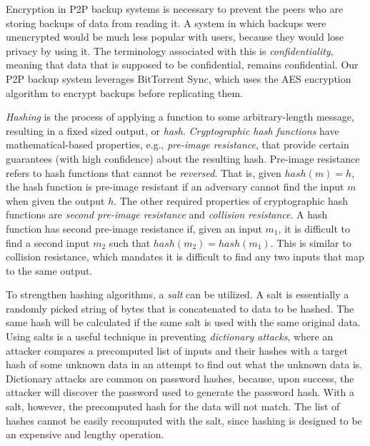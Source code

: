 \documentclass[12pt]{report}
\begin{document}
Encryption in P2P backup systems is necessary to prevent the peers who are storing backups of data from reading it. A system in which backups were unencrypted would be much less popular with users, because they would lose privacy by using it. The terminology associated with this is \textit{confidentiality}, meaning that data that is supposed to be confidential, remains confidential. Our P2P backup system leverages BitTorrent Sync, which uses the AES encryption algorithm to encrypt backups before replicating them.

\textit{Hashing} is the process of applying a function to some arbitrary-length message, resulting in a fixed sized output, or \textit{hash}. \textit{Cryptographic hash functions} have mathematical-based properties, e.g., \textit{pre-image resistance}, that provide certain guarantees (with high confidence) about the resulting hash. Pre-image resistance refers to hash functions that cannot be \textit{reversed}. That is, given $hash(m) = h$, the hash function is pre-image resistant if an adversary cannot find the input $m$ when given the output $h$. The other required properties of cryptographic hash functions are \textit{second pre-image resistance} and \textit{collision resistance}. A hash function has second pre-image resistance if, given an input $m_1$, it is difficult to find a second input $m_2$ such that $hash(m_2) = hash(m_1)$. This is similar to collision resistance, which mandates it is difficult to find any two inputs that map to the same output.

To strengthen hashing algorithms, a \textit{salt} can be utilized. A salt is essentially a randomly picked string of bytes that is concatenated to data to be hashed. The same hash will be calculated if the same salt is used with the same original data. Using salts is a useful technique in preventing \textit{dictionary attacks}, where an attacker compares a precomputed list of inputs and their hashes with a target hash of some unknown data in an attempt to find out what the unknown data is. Dictionary attacks are common on password hashes, because, upon success, the attacker will discover the password used to generate the password hash. With a salt, however, the precomputed hash for the data will not match. The list of hashes cannot be easily recomputed with the salt, since hashing is designed to be an expensive and lengthy operation.
\end{document}
